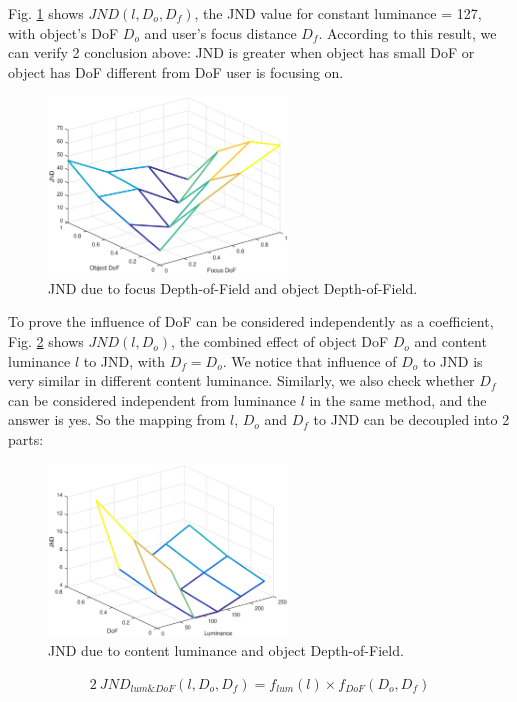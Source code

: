 Fig. \ref{JNDfdof-odof} shows $JND(l, D_o, D_f)$, the JND value for constant luminance = 127, with object's DoF $D_o$ and user's focus distance $D_f$. According to this result, we can verify 2 conclusion above: JND is greater when object has small DoF or object has DoF different from DoF user is focusing on.

\begin{figure}
  \centering
  \includegraphics[width=2.5in]{images/JNDfDoF-oDoF.eps}
  \caption{JND due to focus Depth-of-Field and object Depth-of-Field.}
  \label{JNDfdof-odof}
  \end{figure}

To prove the influence of DoF can be considered independently as a coefficient, Fig. \ref{JNDdof-lum} shows $JND(l, D_o)$, the combined effect of object DoF $D_o$ and content luminance $l$ to JND, with $D_f = D_o$. We notice that influence of $D_o$ to JND is very similar in different content luminance. Similarly, we also check whether $D_f$ can be considered independent from luminance $l$ in the same method, and the answer is yes. So the mapping from $l$, $D_o$ and $D_f$ to JND can be decoupled into 2 parts:

\begin{figure}
  \centering
  \includegraphics[width=2.5in]{images/JNDdof-lum.eps}
  \caption{JND due to content luminance and object Depth-of-Field.}
  \label{JNDdof-lum}
  \end{figure}

\begin{alignat}{2}\
JND_{lum\&DoF}(l, D_o, D_f) = f_{lum}(l) \times f_{DoF}(D_o, D_f)
\end{alignat}

